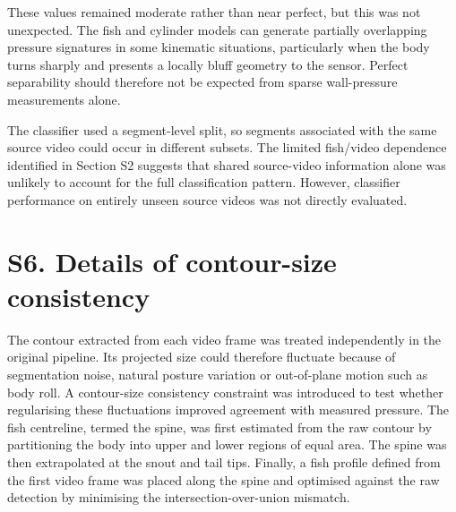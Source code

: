 \documentclass[11pt,a4paper]{article}
\begin{document}
These values remained moderate rather than near perfect, but this was not unexpected. The fish and cylinder models can generate partially overlapping pressure signatures in some kinematic situations, particularly when the body turns sharply and presents a locally bluff geometry to the sensor. Perfect separability should therefore not be expected from sparse wall-pressure measurements alone.

\begin{table}[htbp]
\centering
\caption*{Table S4. Classification accuracies for the first-stage pressure-signal classifier.}
\end{table}

The classifier used a segment-level split, so segments associated with the same source video could occur in different subsets. The limited fish/video dependence identified in Section S2 suggests that shared source-video information alone was unlikely to account for the full classification pattern. However, classifier performance on entirely unseen source videos was not directly evaluated.

\section*{S6. Details of contour-size consistency}

The contour extracted from each video frame was treated independently in the original pipeline. Its projected size could therefore fluctuate because of segmentation noise, natural posture variation or out-of-plane motion such as body roll. A contour-size consistency constraint was introduced to test whether regularising these fluctuations improved agreement with measured pressure. The fish centreline, termed the spine, was first estimated from the raw contour by partitioning the body into upper and lower regions of equal area. The spine was then extrapolated at the snout and tail tips. Finally, a fish profile defined from the first video frame was placed along the spine and optimised against the raw detection by minimising the intersection-over-union mismatch.
\end{document}
